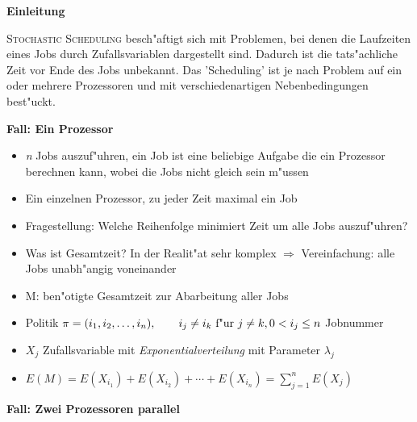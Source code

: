 \documentclass[a4paper]{report}
\begin{document}
\textbf{Einleitung}

\textsc{Stochastic Scheduling} besch"aftigt sich mit Problemen, bei denen die Laufzeiten eines Jobs durch Zufallsvariablen dargestellt sind. Dadurch ist die tats"achliche Zeit vor Ende des Jobs unbekannt. Das 'Scheduling' ist je nach Problem auf ein oder mehrere Prozessoren und mit verschiedenartigen Nebenbedingungen best"uckt.

\textbf{Fall: Ein Prozessor}

\begin{itemize}
\item \emph{n} Jobs auszuf"uhren, ein Job ist eine beliebige Aufgabe die ein Prozessor berechnen kann, wobei die Jobs nicht gleich sein m"ussen
\item Ein einzelnen Prozessor, zu jeder Zeit maximal ein Job 
\item Fragestellung: Welche Reihenfolge minimiert Zeit um alle Jobs auszuf"uhren?
\item Was ist Gesamtzeit? In der Realit"at sehr komplex \(\Rightarrow\) Vereinfachung: alle Jobs unabh"angig voneinander
\item M: ben"otigte Gesamtzeit zur Abarbeitung aller Jobs
\item Politik \(\pi = (i_{1},i_{2},\ldots,i_{n}),\qquad i_{j} \neq i_{k} \textnormal{ f"ur } j \neq k, 0<i_{j}\le n\) Jobnummer
\item \(X_{j}\) Zufallsvariable mit \emph{Exponentialverteilung} mit Parameter \(\lambda_{j}\)
\item \(E(M) = E(X_{i_{1}})+E(X_{i_{2}})+\cdots+E(X_{i_{n}}) = \sum_{j=1}^{n} E(X_{j})\)
\end{itemize}


\textbf{Fall: Zwei Prozessoren parallel}
\end{document}
